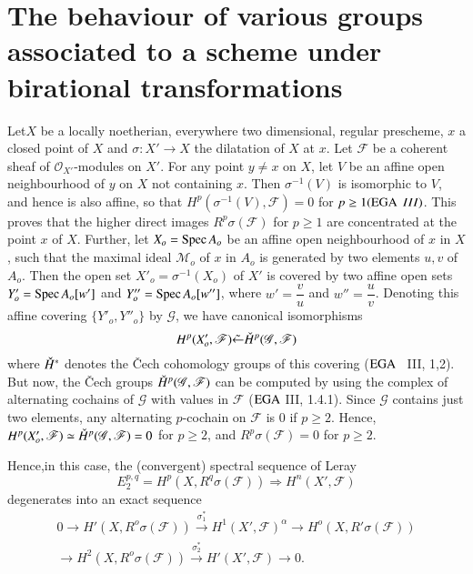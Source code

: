 

\chapter[The behaviour of various groups associated to...]{The behaviour 
of various groups associated to a scheme under 
birational transformations}\label{chap5}%


Let\pageoriginale $X$ be a locally noetherian, everywhere two
dimensional, regular prescheme, $x$ a closed point of $X$ and $\sigma
:X' \to X$ the dilatation of $X$ at $x$. Let $\mathscr{F}$ be a
coherent sheaf of $\mathscr{O}_{X'}$-modules on $X'$. For any point $y
\neq x$ on $X$, let $V$ be an affine open neighbourhood of $y$ on $X$
not  containing 
$x$. Then $\sigma^{-1}(V)$ is isomorphic to $V$, and hence is also
affine, so that $H^{p}(\sigma^{-1}(V),\mathscr{F})=0$ for $p \geq 1
(\operatorname{EGA} ~III)$. This proves that the higher direct images
$R^{p}\sigma(\mathscr{F})$ for $p \geq 1$ are concentrated at the
point $x$ of $X$. Further, let $X_o= \operatorname{Spec} A_o$ be an affine open
neighbourhood of $x$ in $X$, such that the maximal ideal
$\mathcal{M}_o$ of $x$ in $A_o$ is generated by two elements $u, v$ of
$A_o$. Then the open set $X'_o =  \sigma^{-1}(X_o)$ of $X'$ is covered
by two affine open sets $Y'_o = \operatorname{Spec} A_o[w']$ and $Y''_o = \operatorname{Spec}
A_o[w'']$, where $w'= \dfrac{v}{u}$ and $w''
=\dfrac{u}{v}$. Denoting this affine covering $\{Y'_o, Y''_o\}$ by
$\mathscr{G}$, we have canonical isomorphisms 
$$
H^{p}(X'_o, \mathscr{F}) \tilde{\leftarrow} \check{H}^p(\mathscr{G},
\mathscr{F}) 
$$
where $\check{H}^{*}$ denotes the \v{C}ech cohomology groups of this
covering ($\operatorname{EGA}$ ~III, 1,2). But now, the \v{C}ech groups
$\check{H}^{p} (\mathscr{G},\mathscr{F})$ can be computed by using the
complex of alternating cochains of $\mathscr{G}$ with values in
$\mathscr{F}$ ($\operatorname{EGA}$ III, 1.4.1). Since $\mathscr{G}$ contains just two
elements, any alternating $p$-cochain on $\mathscr{F}$ is $0$ if $p \geq
2$. Hence, $H^{p}(X'_o, \mathscr{F})\simeq \check{H}^{p} (\mathscr{G},
\mathscr{F})=0$ for $p \geq 2$, and $R^{p} \sigma(\mathscr{F}) = 0$
for $p \geq 2$. 

Hence,\pageoriginale in this case, the (convergent) spectral sequence
of Leray 
$$
E^{p,q}_2 = H^{p}(X, R^q \sigma (\mathscr{F})) \Longrightarrow H^n
(X', \mathscr{F}) 
$$
degenerates into an exact sequence
\begin{multline*}
  0 \to H' (X, R^o \sigma (\mathscr{F})) \xrightarrow{\sigma^*_1} H^1(X',
  \mathscr{F})^{\alpha} \to H^o(X, R' \sigma (\mathscr{F}))\\ 
  \to H^2(X,R^o \sigma (\mathscr{F})) \xrightarrow{\sigma^*_2} H'(X',
  \mathscr{F}) \to 0. 
\end{multline*}

